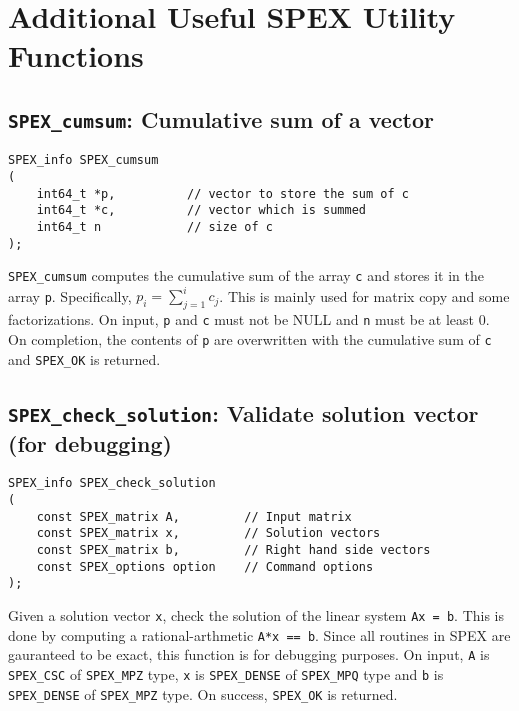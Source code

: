 \documentclass[12pt]{report}
\theoremstyle{definition}
\begin{document}
\section{Additional Useful SPEX Utility Functions}

\cprotect\subsection{\verb|SPEX_cumsum|: Cumulative sum of a vector}


\begin{mdframed}[userdefinedwidth=6in]
{\footnotesize
\begin{verbatim}
SPEX_info SPEX_cumsum
(
    int64_t *p,          // vector to store the sum of c
    int64_t *c,          // vector which is summed
    int64_t n            // size of c
);
\end{verbatim}
} \end{mdframed}


\verb|SPEX_cumsum| computes the cumulative sum of the array \verb|c| and stores it in the array \verb|p|. Specifically, $p_i = \sum_{j = 1}^i c_j$. This is mainly used for matrix copy and some factorizations. On input, \verb|p| and \verb|c| must not be NULL and \verb|n| must be at least 0. On completion, the contents of \verb|p| are overwritten with the cumulative sum of \verb|c| and \verb|SPEX_OK| is returned.


\cprotect\subsection{\verb|SPEX_check_solution|: Validate solution vector (for debugging)}

\begin{mdframed}[userdefinedwidth=6in]
{\footnotesize
\begin{verbatim}
SPEX_info SPEX_check_solution
(
    const SPEX_matrix A,         // Input matrix
    const SPEX_matrix x,         // Solution vectors
    const SPEX_matrix b,         // Right hand side vectors
    const SPEX_options option    // Command options
);
\end{verbatim}
} \end{mdframed}


Given a solution vector \verb|x|, check the solution of the linear system \verb|Ax = b|. This is done by computing a rational-arthmetic \verb|A*x == b|. Since all routines in SPEX are gauranteed to be exact, this function is for debugging purposes. On input, \verb|A| is \verb|SPEX_CSC| of \verb|SPEX_MPZ| type, \verb|x| is \verb|SPEX_DENSE| of \verb|SPEX_MPQ| type and \verb|b| is \verb|SPEX_DENSE| of \verb|SPEX_MPZ| type. On success, \verb|SPEX_OK| is returned.
\end{document}
